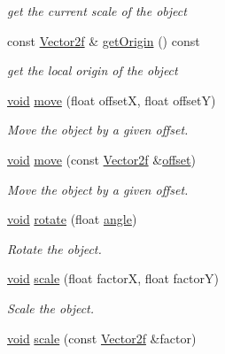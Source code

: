 \begin{DoxyCompactItemize}
\begin{DoxyCompactList}\small\item\em get the current scale of the object \end{DoxyCompactList}\item 
const \hyperlink{namespacesf_acf03098c2577b869e2fa6836cc48f1a0}{Vector2f} \& \hyperlink{classsf_1_1_transformable_a6bddc485d22bb64449d9d2d3a99a778f}{get\-Origin} () const 
\begin{DoxyCompactList}\small\item\em get the local origin of the object \end{DoxyCompactList}\item 
\hyperlink{glutf90_8h_ac778d6f63f1aaf8ebda0ce6ac821b56e}{void} \hyperlink{classsf_1_1_transformable_a86b461d6a941ad390c2ad8b6a4a20391}{move} (float offset\-X, float offset\-Y)
\begin{DoxyCompactList}\small\item\em Move the object by a given offset. \end{DoxyCompactList}\item 
\hyperlink{glutf90_8h_ac778d6f63f1aaf8ebda0ce6ac821b56e}{void} \hyperlink{classsf_1_1_transformable_ab9ca691522f6ddc1a40406849b87c469}{move} (const \hyperlink{namespacesf_acf03098c2577b869e2fa6836cc48f1a0}{Vector2f} \&\hyperlink{gl3_8h_ae1b92ae085ddef4b1cdca7d749339fb0}{offset})
\begin{DoxyCompactList}\small\item\em Move the object by a given offset. \end{DoxyCompactList}\item 
\hyperlink{glutf90_8h_ac778d6f63f1aaf8ebda0ce6ac821b56e}{void} \hyperlink{classsf_1_1_transformable_af8a5ffddc0d93f238fee3bf8efe1ebda}{rotate} (float \hyperlink{_vector3_8h_abd17f37dc7bb5b2bd9a569193ebcdda4}{angle})
\begin{DoxyCompactList}\small\item\em Rotate the object. \end{DoxyCompactList}\item 
\hyperlink{glutf90_8h_ac778d6f63f1aaf8ebda0ce6ac821b56e}{void} \hyperlink{classsf_1_1_transformable_a3de0c6d8957f3cf318092f3f60656391}{scale} (float factor\-X, float factor\-Y)
\begin{DoxyCompactList}\small\item\em Scale the object. \end{DoxyCompactList}\item 
\hyperlink{glutf90_8h_ac778d6f63f1aaf8ebda0ce6ac821b56e}{void} \hyperlink{classsf_1_1_transformable_adecaa6c69b1f27dd5194b067d96bb694}{scale} (const \hyperlink{namespacesf_acf03098c2577b869e2fa6836cc48f1a0}{Vector2f} \&factor)

\end{DoxyCompactItemize}
